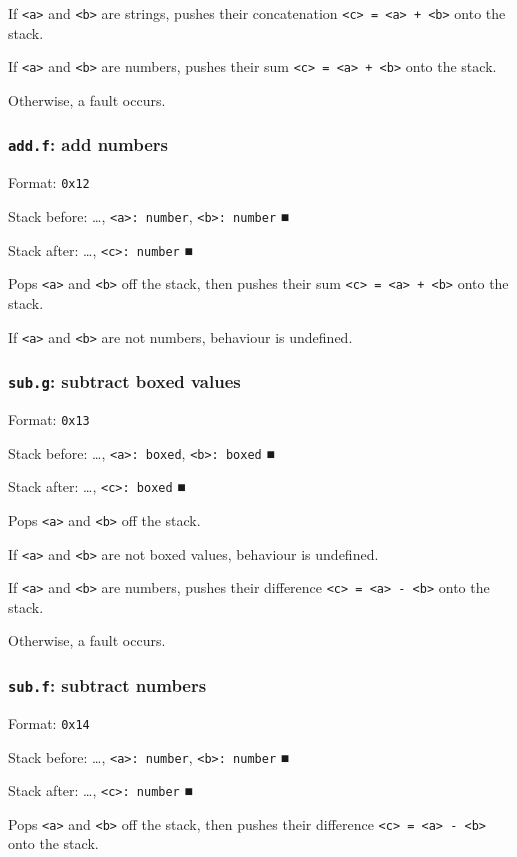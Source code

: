 \documentclass[11pt]{article}
\begin{document}
If \texttt{<a>} and \texttt{<b>} are strings, pushes their concatenation
\texttt{<c> = <a> + <b>} onto the stack.

If \texttt{<a>} and \texttt{<b>} are numbers, pushes their sum \texttt{<c> = <a> + <b>} onto
the stack.

Otherwise, a fault occurs.

\subsubsection{\texttt{add.f}: add numbers}
\label{sec:org117c408}
Format: \texttt{0x12}

Stack before: \ldots{}​, \texttt{<a>: number}, \texttt{<b>: number} ■

Stack after: \ldots{}​, \texttt{<c>: number} ■

Pops \texttt{<a>} and \texttt{<b>} off the stack, then pushes their sum
\texttt{<c> = <a> + <b>} onto the stack.

If \texttt{<a>} and \texttt{<b>} are not numbers, behaviour is undefined.

\subsubsection{\texttt{sub.g}: subtract boxed values}
\label{sec:org379b868}
Format: \texttt{0x13}

Stack before: \ldots{}​, \texttt{<a>: boxed}, \texttt{<b>: boxed} ■

Stack after: \ldots{}​, \texttt{<c>: boxed} ■

Pops \texttt{<a>} and \texttt{<b>} off the stack.

If \texttt{<a>} and \texttt{<b>} are not boxed values, behaviour is undefined.

If \texttt{<a>} and \texttt{<b>} are numbers, pushes their difference
\texttt{<c> = <a> - <b>} onto the stack.

Otherwise, a fault occurs.

\subsubsection{\texttt{sub.f}: subtract numbers}
\label{sec:org371fd15}
Format: \texttt{0x14}

Stack before: \ldots{}​, \texttt{<a>: number}, \texttt{<b>: number} ■

Stack after: \ldots{}​, \texttt{<c>: number} ■

Pops \texttt{<a>} and \texttt{<b>} off the stack, then pushes their difference
\texttt{<c> = <a> - <b>} onto the stack.
\end{document}
